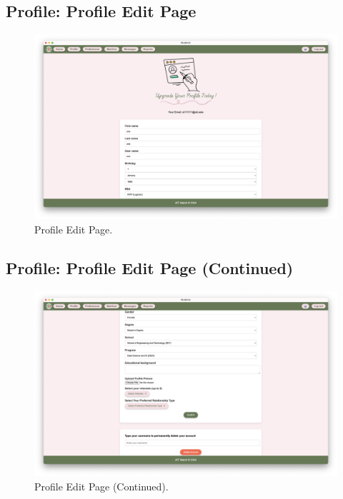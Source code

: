         \newpage
        \subsection{Profile: Profile Edit Page}
        \begin{figure}[h]
                \centering
                \captionsetup{justification=centering, singlelinecheck=false, labelsep=space}
                \includegraphics[width=5in]{figures/results/profiles/edit-profile-page.png} 
                \caption{Profile Edit Page.}
                \label{fig:edit-profile-page}
            \end{figure}

        \subsection{Profile: Profile Edit Page (Continued)}
        \begin{figure}[h]
                \centering
                \captionsetup{justification=centering, singlelinecheck=false, labelsep=space}
                \includegraphics[width=5in]{figures/results/profiles/edit-profile-page2.png} 
                \caption{Profile Edit Page (Continued).}
                \label{fig:edit-profile-page2}
            \end{figure}

